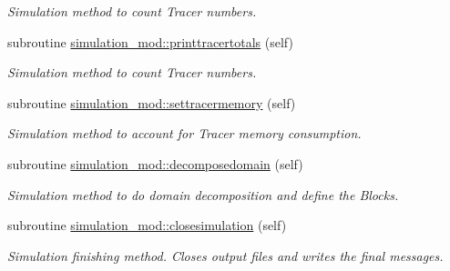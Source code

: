 \begin{DoxyCompactItemize}
\begin{DoxyCompactList}\small\item\em Simulation method to count Tracer numbers. \end{DoxyCompactList}\item 
subroutine \mbox{\hyperlink{namespacesimulation__mod_aba126a8e0575cabb3bef6ab395002b3c}{simulation\+\_\+mod\+::printtracertotals}} (self)
\begin{DoxyCompactList}\small\item\em Simulation method to count Tracer numbers. \end{DoxyCompactList}\item 
subroutine \mbox{\hyperlink{namespacesimulation__mod_a54a9a06a7259eb792b9b63d2658a4170}{simulation\+\_\+mod\+::settracermemory}} (self)
\begin{DoxyCompactList}\small\item\em Simulation method to account for Tracer memory consumption. \end{DoxyCompactList}\item 
subroutine \mbox{\hyperlink{namespacesimulation__mod_a2b8198a9fb3f7671c6b45192a0b9740c}{simulation\+\_\+mod\+::decomposedomain}} (self)
\begin{DoxyCompactList}\small\item\em Simulation method to do domain decomposition and define the Blocks. \end{DoxyCompactList}\item 
subroutine \mbox{\hyperlink{namespacesimulation__mod_a4285722eaa589fa671233554b54c74f8}{simulation\+\_\+mod\+::closesimulation}} (self)
\begin{DoxyCompactList}\small\item\em Simulation finishing method. Closes output files and writes the final messages. \end{DoxyCompactList}\end{DoxyCompactItemize}
